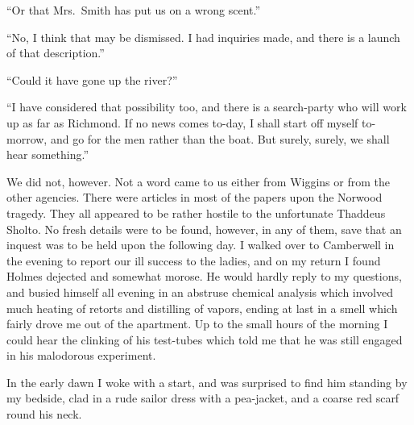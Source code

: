 \documentclass[12pt,english,oneside]{book}
\begin{document}
{}``Or that Mrs.\ Smith has put us on a wrong scent.''

{}``No, I think that may be dismissed. I had inquiries made, and
there is a launch of that description.''

{}``Could it have gone up the river?''

{}``I have considered that possibility too, and there is a search-party
who will work up as far as Richmond. If no news comes to-day, I shall
start off myself to-morrow, and go for the men rather than the boat.
But surely, surely, we shall hear something.''

We did not, however. Not a word came to us either from Wiggins or
from the other agencies. There were articles in most of the papers
upon the Norwood tragedy. They all appeared to be rather hostile to
the unfortunate Thaddeus Sholto. No fresh details were to be found,
however, in any of them, save that an inquest was to be held upon
the following day. I walked over to Camberwell in the evening to report
our ill success to the ladies, and on my return I found Holmes dejected
and somewhat morose. He would hardly reply to my questions, and busied
himself all evening in an abstruse chemical analysis which involved
much heating of retorts and distilling of vapors, ending at last in
a smell which fairly drove me out of the apartment. Up to the small
hours of the morning I could hear the clinking of his test-tubes which
told me that he was still engaged in his malodorous experiment.

In the early dawn I woke with a start, and was surprised to find him
standing by my bedside, clad in a rude sailor dress with a pea-jacket,
and a coarse red scarf round his neck.
\end{document}
